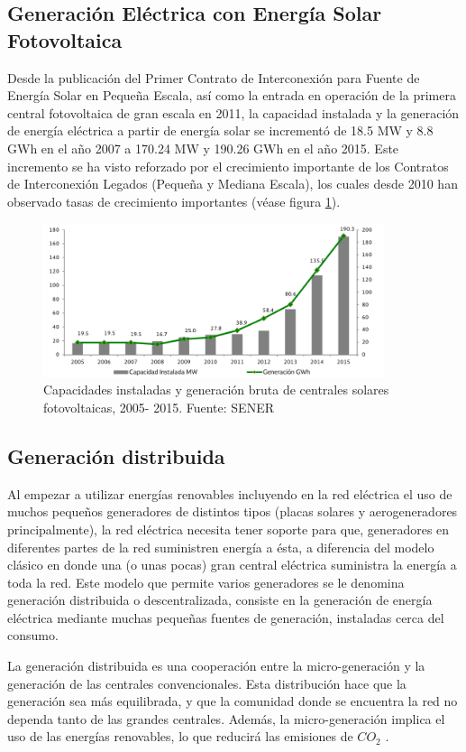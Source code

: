 \subsection{Generación Eléctrica con Energía Solar Fotovoltaica}
Desde la publicación del Primer Contrato de Interconexión para Fuente de Energía Solar en Pequeña Escala, así como la entrada en operación de la primera central fotovoltaica de gran escala en 2011, la capacidad instalada y la generación de energía eléctrica a partir de energía solar se incrementó de 18.5 MW y 8.8 GWh en el año 2007 a 170.24 MW y 190.26 GWh en el año 2015. Este incremento se ha visto reforzado por el crecimiento importante de los Contratos de Interconexión Legados (Pequeña y Mediana Escala), los cuales desde 2010 han observado tasas de crecimiento importantes (véase figura \ref{solar}).

\begin{figure}[!h]
	\centering
	\includegraphics[width=10cm]{img/solar.png}
	\caption{Capacidades instaladas y generación bruta de centrales solares fotovoltaicas, 2005- 2015. Fuente: SENER}
	\label{solar}
\end{figure}

\subsection{Generación distribuida}
Al empezar a utilizar energías renovables incluyendo en la red eléctrica el uso de muchos pequeños generadores de distintos tipos (placas solares y aerogeneradores principalmente), la red eléctrica necesita tener soporte para que, generadores en diferentes partes de la red suministren energía a ésta, a diferencia del modelo clásico en donde una (o unas pocas) gran central eléctrica suministra la energía a toda la red. Este modelo que permite varios generadores se le denomina generación distribuida o descentralizada, consiste en la generación de energía eléctrica mediante muchas pequeñas fuentes de generación, instaladas cerca del consumo. 

La generación distribuida es una cooperación entre la micro-generación  y la generación de las centrales convencionales. Esta distribución hace que la generación sea más equilibrada, y que la comunidad donde se encuentra la red no dependa tanto de las grandes centrales. Además, la micro-generación implica el uso de las energías renovables, lo que reducirá las emisiones de $CO_2$ \cite{Endesaeduca}.

